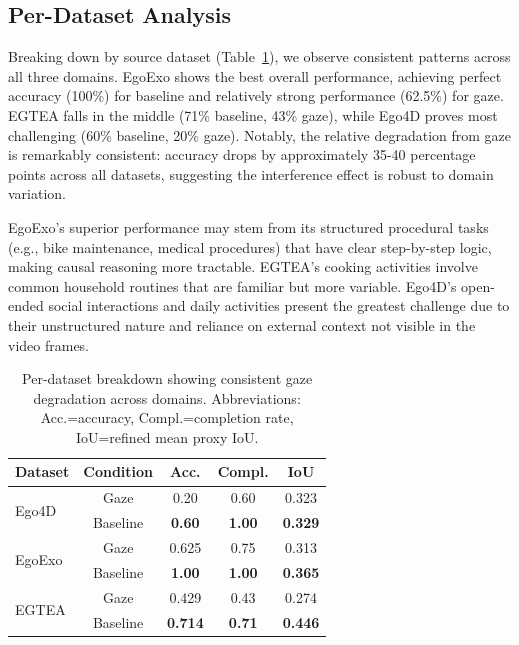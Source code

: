 \documentclass[11pt]{article}
\begin{document}
\subsection{Per-Dataset Analysis}
Breaking down by source dataset (Table~\ref{tab:by-dataset}), we observe consistent patterns across all three domains. EgoExo shows the best overall performance, achieving perfect accuracy (100\%) for baseline and relatively strong performance (62.5\%) for gaze. EGTEA falls in the middle (71\% baseline, 43\% gaze), while Ego4D proves most challenging (60\% baseline, 20\% gaze). Notably, the relative degradation from gaze is remarkably consistent: accuracy drops by approximately 35-40 percentage points across all datasets, suggesting the interference effect is robust to domain variation.

EgoExo's superior performance may stem from its structured procedural tasks (e.g., bike maintenance, medical procedures) that have clear step-by-step logic, making causal reasoning more tractable. EGTEA's cooking activities involve common household routines that are familiar but more variable. Ego4D's open-ended social interactions and daily activities present the greatest challenge due to their unstructured nature and reliance on external context not visible in the video frames.

\begin{table}[t]
\centering
\small
\begin{tabular}{lcccc}
\toprule
\textbf{Dataset} & \textbf{Condition} & \textbf{Acc.} & \textbf{Compl.} & \textbf{IoU} \\
\midrule
\multirow{2}{*}{Ego4D} & Gaze & 0.20 & 0.60 & 0.323 \\
& Baseline & \textbf{0.60} & \textbf{1.00} & \textbf{0.329} \\
\midrule
\multirow{2}{*}{EgoExo} & Gaze & 0.625 & 0.75 & 0.313 \\
& Baseline & \textbf{1.00} & \textbf{1.00} & \textbf{0.365} \\
\midrule
\multirow{2}{*}{EGTEA} & Gaze & 0.429 & 0.43 & 0.274 \\
& Baseline & \textbf{0.714} & \textbf{0.71} & \textbf{0.446} \\
\bottomrule
\end{tabular}
\caption{Per-dataset breakdown showing consistent gaze degradation across domains. Abbreviations: Acc.=accuracy, Compl.=completion rate, IoU=refined mean proxy IoU.}
\label{tab:by-dataset}
\end{table}
\end{document}
